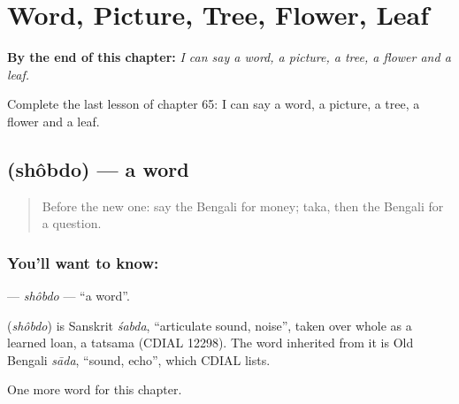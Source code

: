 
\chapter{Word, Picture, Tree, Flower, Leaf}
\label{ch:bn-word-picture-tree-flower-leaf}

\begin{chapteropening}
\textbf{By the end of this chapter:} \emph{I can say a word, a picture, a tree, a flower and a leaf.}

Complete the last lesson of chapter 65: I can say a word, a picture, a tree, a flower and a leaf.
\end{chapteropening}

\section[\texorpdfstring{\bn{শব্দ} (shôbdo)}{শব্দ (shôbdo)}]{ (shôbdo) — a word}

\label{lesson:BN-C65-shobdo}



\begin{quote}
Before the new one: say the Bengali for money; taka, then the Bengali for a question.
\end{quote}

\subsection*{You'll want to know: }
\textbf{} — \emph{shôbdo} — \textquotedblleft{}a word\textquotedblright{}.

\begin{cousinweb}
\textbf{} (\emph{shôbdo}) is Sanskrit \emph{śabda}, \textquotedblleft{}articulate sound, noise\textquotedblright{}, taken over whole as a learned loan, a tatsama (CDIAL 12298). The word inherited from it is Old Bengali \emph{sāda}, \textquotedblleft{}sound, echo\textquotedblright{}, which CDIAL lists.
\end{cousinweb}

\begin{grammarlens}[title={What you've built}]
One more word for this chapter.
\end{grammarlens}

